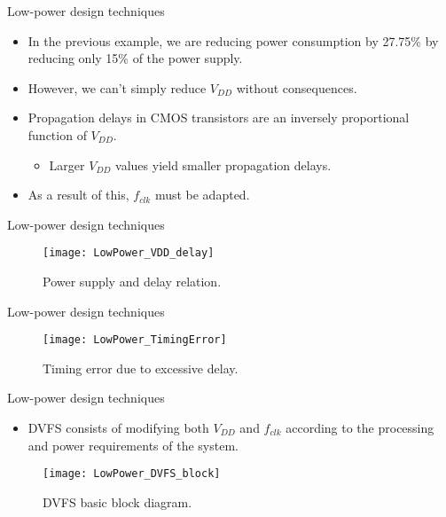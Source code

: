 \documentclass[]{slides}
\begin{document}
\begin{frame}{Low-power design techniques}{}
\begin{itemize}
\item In the previous example, we are reducing power consumption by 27.75\% by reducing only 15\% of the power supply.
\item However, we can't simply reduce $V_{DD}$ without consequences.
\pause
\item Propagation delays in \acf{CMOS} transistors are an inversely proportional function of $V_{DD}$.
\begin{itemize}
  \item Larger $V_{DD}$ values yield smaller propagation delays.
\end{itemize}
\item As a result of this, $f_{clk}$ must be adapted.
\end{itemize}
\end{frame}

\begin{frame}{Low-power design techniques}{}
\begin{figure}
\texttt{[image: LowPower\_VDD\_delay]}
\caption{Power supply and delay relation.}
\label{Figure:VDD_delay}
\end{figure}
\end{frame}

\begin{frame}{Low-power design techniques}{}
\begin{figure}
\texttt{[image: LowPower\_TimingError]}
\caption{Timing error due to excessive delay.}
\label{Figure:Timing error}
\end{figure}
\end{frame}

\begin{frame}{Low-power design techniques}{}
\begin{itemize}
\item \ac{DVFS} consists of modifying both $V_{DD}$ and $f_{clk}$ according to the processing and power requirements of the system.
\end{itemize}
\begin{figure}
\texttt{[image: LowPower\_DVFS\_block]}
\caption{DVFS basic block diagram.}
\label{Figure:DVFS_block}
\end{figure}

\end{frame}
\end{document}
